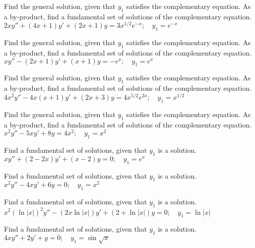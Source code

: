 \documentclass{ximera}
\begin{document}
\begin{problem}\label{exer:5.6.14}
Find the general solution,
given that $y_1$ satisfies the complementary equation. As a by-product,
find a fundamental set of solutions of the complementary equation. $2xy''+(4x+1)y'+(2x+1)y=3x^{1/2}e^{-x};  \quad y_1=e^{-x}$
\end{problem}

\begin{problem}\label{exer:5.6.15}
Find the general solution,
given that $y_1$ satisfies the complementary equation. As a by-product,
find a fundamental set of solutions of the complementary equation. $xy''-(2x+1)y'+(x+1)y=-e^x;  \quad y_1=e^x$
\end{problem}

\begin{problem}\label{exer:5.6.16}
Find the general solution,
given that $y_1$ satisfies the complementary equation. As a by-product,
find a fundamental set of solutions of the complementary equation. $4x^2y''-4x(x+1)y'+(2x+3)y=4x^{5/2}e^{2x};  \quad y_1=x^{1/2}$
\end{problem}

\begin{problem}\label{exer:5.6.17}
Find the general solution,
given that $y_1$ satisfies the complementary equation. As a by-product,
find a fundamental set of solutions of the complementary equation. $x^2y''-5xy'+8y=4x^2;  \quad y_1=x^2$
\end{problem}

\begin{problem}\label{exer:5.6.18} Find a
fundamental set of solutions, given that $y_1$ is a solution. $xy''+(2-2x)y'+(x-2)y=0;    \quad y_1=e^x$
\end{problem}

\begin{problem}\label{exer:5.6.19}
Find a
fundamental set of solutions, given that $y_1$ is a solution. $x^2y''-4xy'+6y=0;   \quad y_1=x^2$
\end{problem}

\begin{problem}\label{exer:5.6.20}
Find a
fundamental set of solutions, given that $y_1$ is a solution. $x^2(\ln |x|)^2y''-(2x \ln |x|)y'+(2+\ln |x|)y=0;   \quad y_1=\ln |x|$
\end{problem}

\begin{problem}\label{exer:5.6.21}
Find a
fundamental set of solutions, given that $y_1$ is a solution. $4xy''+2y'+y=0;  \quad y_1=\sin \sqrt{x}$
\end{problem}
\end{document}
